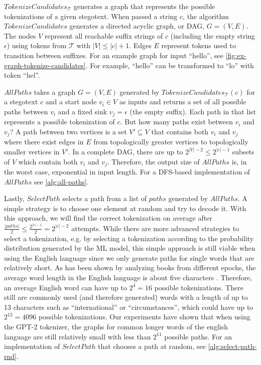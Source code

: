 $TokenizeCandidates_{\mathcal{T}}$ generates a graph that represents the possible tokenizations of a given stegotext.
When passed a string $c$, the algorithm $TokenizeCandidates$ generates a directed acyclic graph, or DAG, $G = (V, E)$.
The nodes $V$ represent all reachable suffix strings of $c$ (including the empty string $\epsilon$) using tokens from $\mathcal{T}$ with $|V| \leq |c| + 1$.
Edges $E$ represent tokens used to transition between suffixes.
For an example graph for input ``hello'', see \autoref{fig:ex-graph-tokenize-candidates}.
For example, ``hello'' can be transformed to ``lo'' with token ``hel''.

$AllPaths$ takes a graph $G = (V, E)$ generated by $TokenizeCandidates_{\mathcal{T}}(c)$ for a stegotext $c$ and a start node $v_i \in V$ as inputs and returns a set of all possible paths between $v_i$ and a fixed sink $v_j = \epsilon$ (the empty suffix).
Each path in that list represents a possible tokenization of $c$.
But how many paths exist between $v_i$ and $v_j$?
A path between two vertices is a set $V' \subseteq V$ that contains both $v_i$ and $v_j$ where there exist edges in $E$ from topologically greater vertices to topologically smaller vertices in $V'$.
In a complete DAG, there are up to $2^{|V|-2} \leq 2^{|c|-1}$ subsets of $V$ which contain both $v_i$ and $v_j$.
Therefore, the output size of $AllPaths$ is, in the worst case, exponential in input length.
For a DFS-based implementation of $AllPaths$ see \autoref{alg:all-paths}.

Lastly, $SelectPath$ selects a path from a list of $paths$ generated by $AllPaths$.
A simple strategy is to choose one element at random and try to decode it.
With this approach, we will find the correct tokenization on average after $\frac{|paths|}{2} \leq \frac{2^{|c|-1}}{2} = 2^{|c|-2}$ attempts.
While there are more advanced strategies to select a tokenization, e.g. by selecting a tokenization according to the probability distribution generated by the ML model, this simple approach is still viable when using the English language since we only generate paths for single words that are relatively short.
As has been shown by analyzing books from different epochs, the average word length in the English language is about five characters \cite{BoShSo2012}.
Therefore, an average English word can have up to $2^4 = 16$ possible tokenizations.
There still are commonly used (and therefore generated) words with a length of up to 13 characters such as ``international'' or ``circumstances'', which could have up to $2^{12} = 4096$ possible tokenizations.
Our experiments have shown that when using the GPT-2 tokenizer, the graphs for common longer words of the english language are still relatively small with less than $2^{11}$ possible paths.
For an implementation of $SelectPath$ that chooses a path at random, see \autoref{alg:select-path-rnd}.



